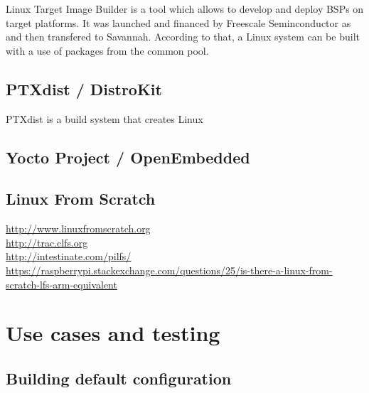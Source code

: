 \documentclass[printmode]{mgr}
\begin{document}

Linux Target Image Builder is a tool which allows to develop and deploy BSPs on target platforms. It was launched and financed by Freescale Seminconductor as  and then transfered to Savannah. According to that, a Linux system can be built with a use of packages from the common pool.

\section{PTXdist / DistroKit}


PTXdist is a build system that creates Linux 

\section{Yocto Project / OpenEmbedded}

\section{Linux From Scratch}

\url{http://www.linuxfromscratch.org}\\
\url{http://trac.clfs.org}\\
\url{http://intestinate.com/pilfs/}\\
\url{https://raspberrypi.stackexchange.com/questions/25/is-there-a-linux-from-scratch-lfs-arm-equivalent}

\chapter{Use cases and testing}
\label{chapter:software}

\section{Building default configuration}
\end{document}
